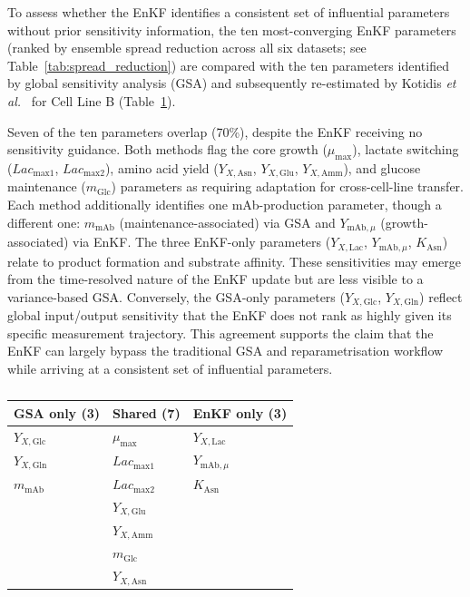\label{SI:gsa_comparison}
{\color{blue}
To assess whether the EnKF identifies a consistent set of influential parameters without prior sensitivity information, the ten most-converging EnKF parameters (ranked by ensemble spread reduction across all six datasets; see Table~\ref{tab:spread_reduction}) are compared with the ten parameters identified by global sensitivity analysis (GSA) and subsequently re-estimated by Kotidis \textit{et al.}~\cite{Kotidis2019UseCultures} for Cell Line B (Table~\ref{tab:param_overlap}).

Seven of the ten parameters overlap (70\%), despite the EnKF receiving no sensitivity guidance. Both methods flag the core growth ($\mu_{\text{max}}$), lactate switching ($Lac_{\text{max1}}$, $Lac_{\text{max2}}$), amino acid yield ($Y_{X,\text{Asn}}$, $Y_{X,\text{Glu}}$, $Y_{X,\text{Amm}}$), and glucose maintenance ($m_{\text{Glc}}$) parameters as requiring adaptation for cross-cell-line transfer. Each method additionally identifies one mAb-production parameter, though a different one: $m_{\text{mAb}}$ (maintenance-associated) via GSA and $Y_{\text{mAb},\mu}$ (growth-associated) via EnKF. The three EnKF-only parameters ($Y_{X,\text{Lac}}$, $Y_{\text{mAb},\mu}$, $K_{\text{Asn}}$) relate to product formation and substrate affinity. These sensitivities may emerge from the time-resolved nature of the EnKF update but are less visible to a variance-based GSA. Conversely, the GSA-only parameters ($Y_{X,\text{Glc}}$, $Y_{X,\text{Gln}}$) reflect global input/output sensitivity that the EnKF does not rank as highly given its specific measurement trajectory. This agreement supports the claim that the EnKF can largely bypass the traditional GSA and reparametrisation workflow while arriving at a consistent set of influential parameters.
}

\begin{table}[ht]
\centering
\renewcommand{\arraystretch}{1.3}
\small
\setlength{\tabcolsep}{8pt}
\caption{}
\label{tab:param_overlap}
\begin{tabular}{|l|l|l|}
\hline
\rowcolor{gray!30}
\textbf{GSA only (3)} & \textbf{Shared (7)} & \textbf{EnKF only (3)} \\
\hline
$Y_{X,\text{Glc}}$ & $\mu_{\text{max}}$      & $Y_{X,\text{Lac}}$ \\
$Y_{X,\text{Gln}}$ & $Lac_{\text{max1}}$     & $Y_{\text{mAb},\mu}$ \\
$m_{\text{mAb}}$    & $Lac_{\text{max2}}$     & $K_{\text{Asn}}$ \\
                     & $Y_{X,\text{Glu}}$     & \\
                     & $Y_{X,\text{Amm}}$     & \\
                     & $m_{\text{Glc}}$        & \\
                     & $Y_{X,\text{Asn}}$     & \\
\hline
\end{tabular}
\end{table}
